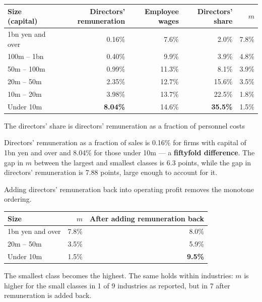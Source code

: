 \begin{center}
\begin{tabular}{@{}lrrrr@{}}
\toprule
Size (capital) & Directors' remuneration & Employee wages & Directors' share & $m$ \\
\midrule
1bn yen and over & 0.16\% & 7.6\% & 2.0\% & 7.8\% \\
100m -- 1bn & 0.40\% & 9.9\% & 3.9\% & 4.8\% \\
50m -- 100m & 0.99\% & 11.3\% & 8.1\% & 3.9\% \\
20m -- 50m & 2.35\% & 12.7\% & 15.6\% & 3.5\% \\
10m -- 20m & 3.98\% & 13.7\% & 22.5\% & 1.8\% \\
Under 10m & \textbf{8.04\%} & 14.6\% & \textbf{35.5\%} & 1.5\% \\
\bottomrule
\end{tabular}
\label{tab:officer-comp-by-size}
\end{center}
\begin{center}\footnotesize The directors' share is directors' remuneration as a fraction of personnel costs\end{center}

\begin{proposition}
\label{prop:officer}
Directors' remuneration as a fraction of sales is 0.16\% for firms with capital of 1bn yen
and over and 8.04\% for those under 10m --- a \textbf{fiftyfold difference}. The gap in $m$
between the largest and smallest classes is 6.3 points, while the gap in directors'
remuneration is 7.88 points, large enough to account for it.

Adding directors' remuneration back into operating profit removes the monotone ordering.
\begin{center}
\begin{tabular}{@{}lrr@{}}
\toprule
Size & $m$ & After adding remuneration back \\
\midrule
1bn yen and over & 7.8\% & 8.0\% \\
20m -- 50m & 3.5\% & 5.9\% \\
Under 10m & 1.5\% & \textbf{9.5\%} \\
\bottomrule
\end{tabular}
\label{tab:officer-comp-adjusted}
\end{center}
The smallest class becomes the highest. The same holds within industries: $m$ is higher for
the small classes in 1 of 9 industries as reported, but in 7 after remuneration is added
back.
\end{proposition}

